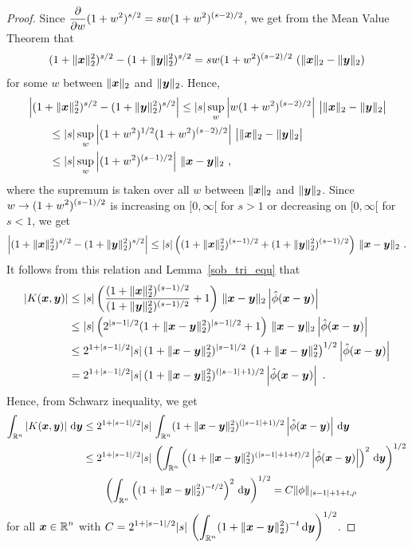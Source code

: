 \begin{proof}
Since
$\DS \pdfdx{(1+w^2)^{s/2}}{w} = sw(1+w^2)^{(s-2)/2}$, we get
from the Mean Value Theorem that
\[
(1+\|\VEC{x}\|_2^2)^{s/2} - (1+\|\VEC{y}\|_2^2)^{s/2}
= sw(1+w^2)^{(s-2)/2} \, \left( \|\VEC{x}\|_2 - \|\VEC{y}\|_2 \right)
\]
for some $w$ between $\|\VEC{x}\|_2$ and $\|\VEC{y}\|_2$.  Hence,
\begin{align*}
&\left| (1+\|\VEC{x}\|_2^2)^{s/2} - (1+\|\VEC{y}\|_2^2)^{s/2} \right|
\leq |s| \sup_{w} \left| w(1+w^2)^{(s-2)/2}\right|
\, \big| \|\VEC{x}\|_2 - \|\VEC{y}\|_2 \big| \\
&\qquad \leq |s| \sup_{w} \left| (1 + w^2)^{1/2} (1+w^2)^{(s-2)/2}\right|
\, \big| \|\VEC{x}\|_2 - \|\VEC{y}\|_2 \big| \\
&\qquad \leq |s| \sup_{w} \left|(1+w^2)^{(s-1)/2}\right|
\, \|\VEC{x} - \VEC{y}\|_2 \ ,
\end{align*}
where the supremum is taken over all $w$ between $\|\VEC{x}\|_2$ and
$\|\VEC{y}\|_2$.  Since $\DS w \to (1+w^2)^{(s-1)/2}$ is increasing on
$[0,\infty[$ for $s > 1$ or decreasing on $[0,\infty[$ for $s<1$, we
get
\[
\left| (1+\|\VEC{x}\|_2^2)^{s/2} - (1+\|\VEC{y}\|_2^2)^{s/2} \right|
\leq |s| \left( (1+\|\VEC{x}\|_2^2)^{(s-1)/2} + (1+\|\VEC{y}\|_2^2)^{(s-1)/2}
\right) \, \|\VEC{x} - \VEC{y}\|_2 \ .
\]
It follows from this relation and Lemma~\ref{sob_tri_equ} that
\begin{align*}
\left| K(\VEC{x},\VEC{y}) \right|
&\leq |s| \left(
\frac{(1+\|\VEC{x}\|_2^2)^{(s-1)/2}}{(1+\|\VEC{y}\|_2^2)^{(s-1)/2}} + 1 \right)
\, \|\VEC{x} - \VEC{y}\|_2
\left|\hat{\phi}(\VEC{x}-\VEC{y})\right| \\
&\leq  |s| \left( 2^{|s-1|/2} (1+\|\VEC{x}-\VEC{y}\|_2^2)^{|s-1|/2} + 1 \right)
\, \|\VEC{x} - \VEC{y}\|_2
\left|\hat{\phi}(\VEC{x}-\VEC{y})\right| \\
&\leq 2^{1+|s-1|/2} |s|\, (1+\|\VEC{x}-\VEC{y}\|_2^2)^{|s-1|/2}
\, \left( 1 + \|\VEC{x} - \VEC{y}\|_2^2\right)^{1/2}
\left|\hat{\phi}(\VEC{x}-\VEC{y})\right| \\
&= 2^{1+|s-1|/2} |s|\, (1+\|\VEC{x}-\VEC{y}\|_2^2)^{(|s-1|+1)/2}
\left|\hat{\phi}(\VEC{x}-\VEC{y})\right| \ .
\end{align*}
Hence, from Schwarz inequality, we get
\begin{align*}
\int_{\RR^n} \left|K(\VEC{x},\VEC{y})\right| \dx{\VEC{y}}
&\leq 2^{1+|s-1|/2} |s|\, \int_{\RR^n} (1+\|\VEC{x}-\VEC{y}\|_2^2)^{(|s-1|+1)/2}
\left|\hat{\phi}(\VEC{x}-\VEC{y})\right| \dx{\VEC{y}} \\
&\leq  2^{1+|s-1|/2} |s|\, \left(\int_{\RR^n}
\left((1+\|\VEC{x}-\VEC{y}\|_2^2)^{(|s-1|+1+t)/2}
\left|\hat{\phi}(\VEC{x}-\VEC{y})\right|\right)^2 \dx{\VEC{y}} \right)^{1/2} \\
&\qquad \left( \int_{\RR^n} \left( (1+\|\VEC{x}-\VEC{y}\|_2^2)^{-t/2} \right)^2 
\dx{\VEC{y}} \right)^{1/2}
= C \|\phi\|_{|s-1|+1+t,\rho}
\end{align*}
for all $\DS \VEC{x} \in \RR^n$ with
$\DS C = 2^{1+|s-1|/2} |s|\, 
\left( \int_{\RR^n} (1+\|\VEC{x}-\VEC{y}\|_2^2)^{-t}\dx{\VEC{y}} \right)^{1/2}$.


\end{proof}
